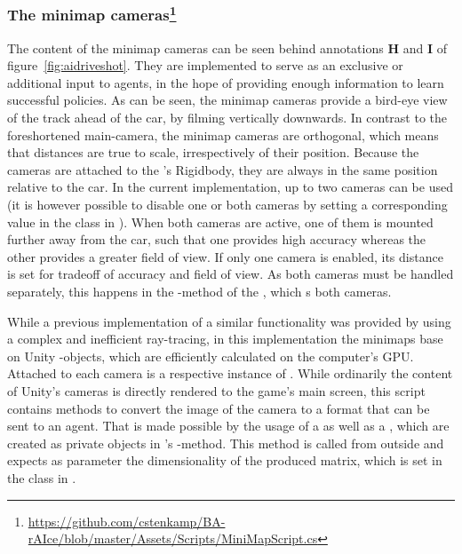 \subsubsection{The minimap cameras\footnote{\url{https://github.com/cstenkamp/BA-rAIce/blob/master/Assets/Scripts/MiniMapScript.cs}}}
\label{ch:minimap}

The content of the minimap cameras can be seen behind annotations \textbf{H} and \textbf{I} of figure~\ref{fig:aidriveshot}. They are implemented to serve as an exclusive or additional input to agents, in the hope of providing enough information to learn successful policies. As can be seen, the minimap cameras provide a bird-eye view of the track ahead of the car, by filming vertically downwards. In contrast to the foreshortened main-camera, the minimap cameras are orthogonal, which means that distances are true to scale, irrespectively of their position. Because the cameras are attached to the 's Rigidbody, they are always in the same position relative to the car. In the current implementation, up to two cameras can be used (it is however possible to disable one or both cameras by setting a corresponding value in the class  in ). When both cameras are active, one of them is mounted further away from the car, such that one provides high accuracy whereas the other provides a greater field of view. If only one camera is enabled, its distance is set for tradeoff of accuracy and field of view. As both cameras must be handled separately, this happens in the -method of the , which s both cameras.

While a previous implementation of a similar functionality was provided by \leon using a complex and inefficient ray-tracing, in this implementation the minimaps base on Unity -objects, which are efficiently calculated on the computer's GPU. Attached to each camera is a respective instance of . While ordinarily the content of Unity's cameras is directly rendered to the game's main screen, this script contains methods to convert the image of the camera to a format that can be sent to an agent. That is made possible by the usage of a  as well as a , which are created as private objects in 's -method. This method is called from outside and expects as parameter the dimensionality of the produced matrix, which is set in the class  in . 

